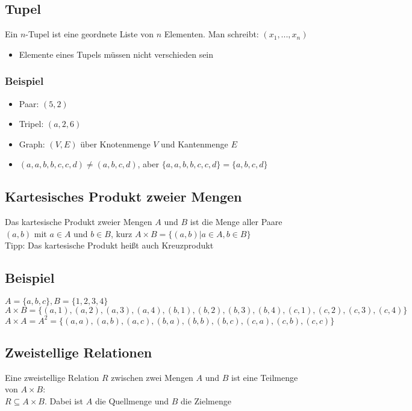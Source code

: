 \subsection{Tupel}
Ein $n$-Tupel ist eine geordnete Liste von $n$ Elementen. Man schreibt: $(x_1,...,x_n)$
\begin{itemize}
    \item Elemente eines Tupels müssen nicht verschieden sein
\end{itemize}
\subsubsection{Beispiel}
\begin{itemize}
    \item Paar: $(5,2)$
    \item Tripel: $(a,2,6)$
    \item Graph: $(V,E)$ über Knotenmenge $V$ und Kantenmenge $E$
    \item $(a,a,b,b,c,c,d)\neq (a,b,c,d)$, aber $\{a,a,b,b,c,c,d\}=\{a,b,c,d\}$
\end{itemize}

\subsection{Kartesisches Produkt zweier Mengen}
Das kartesische Produkt zweier Mengen $A$ und $B$ ist die Menge aller Paare $(a,b)$ mit $a\in A$ und $b\in B$, kurz $A\times B=\{(a,b)|a\in A,b\in B\}$\\
{\bfseries }Tipp: Das kartesische Produkt heißt auch Kreuzprodukt
\subsection{Beispiel}
$A=\{a,b,c\},B=\{1,2,3,4\}$\\
$A\times B=\{(a,1),(a,2),(a,3),(a,4),(b,1),(b,2),(b,3),(b,4),(c,1),(c,2),(c,3),(c,4)\}$\\
$A\times A=A^2=\{(a,a),(a,b),(a,c),(b,a),(b,b),(b,c),(c,a),(c,b),(c,c)\}$

\subsection{Zweistellige Relationen}
Eine zweistellige Relation $R$ zwischen zwei Mengen $A$ und $B$ ist eine Teilmenge von $A\times B$:\\
$R\subseteq A\times B$. Dabei ist $A$ die Quellmenge und $B$ die Zielmenge